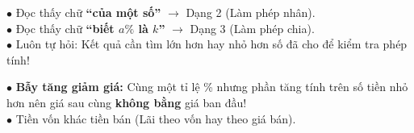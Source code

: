 \documentclass[14pt,a4paper,oneside]{extbook}
\begin{document}
\noindent
\begin{minipage}[t]{0.54\textwidth}
  \begin{tcolorbox}[
    enhanced,
    title={\footnotesize\bfseries\color{white}\faKey\ Bí kíp phân biệt Dạng 2 và Dạng 3},
    colback=green!3!white,
    colframe=green!60!black,
    arc=2.5mm, boxrule=0.8pt, top=1.8mm, bottom=1.8mm, left=2.2mm, right=2.2mm
  ]
    \footnotesize
    $\bullet$ Đọc thấy chữ \textbf{``của một số''} $\rightarrow$ Dạng 2 (Làm phép nhân).\\
    $\bullet$ Đọc thấy chữ \textbf{``biết $a\%$ là $k$''} $\rightarrow$ Dạng 3 (Làm phép chia).\\
    $\bullet$ Luôn tự hỏi: Kết quả cần tìm lớn hơn hay nhỏ hơn số đã cho để kiểm tra phép tính!
  \end{tcolorbox}
\end{minipage}%
\hfill
\begin{minipage}[t]{0.44\textwidth}
  \begin{tcolorbox}[
    enhanced,
    title={\footnotesize\bfseries\color{white}\faExclamationTriangle\ Mẹo tránh bẫy trắc nghiệm},
    colback=red!2!white,
    colframe=red!70!black,
    arc=2.5mm, boxrule=0.8pt, top=1.8mm, bottom=1.8mm, left=2.2mm, right=2.2mm
  ]
    \footnotesize
    $\bullet$ \textbf{Bẫy tăng giảm giá:} Cùng một tỉ lệ \% nhưng phần tăng tính trên số tiền nhỏ hơn nên giá sau cùng \textbf{không bằng} giá ban đầu!\\
    $\bullet$ Tiền vốn khác tiền bán (Lãi theo vốn hay theo giá bán).
  \end{tcolorbox}
\end{minipage}
\end{document}
